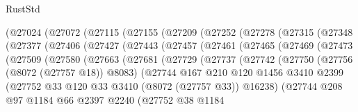 \begin{lexlean}{RustStd}
\begin{coremodule}
    (@27024
      (@27072
        (@27115
          (@27155
            (@27209
              (@27252
                (@27278
                  (@27315
                    (@27348
                      (@27377
                        (@27406
                          (@27427
                            (@27443
                              (@27457
                                (@27461
                                  (@27465
                                    (@27469
                                      (@27473
                                        (@27509
                                          (@27580
                                            (@27663
                                              (@27681
                                                (@27729
                                                  (@27737
                                                    (@27742
                                                      (@27750
                                                        (@27756 (@8072 (@27757 @18)) @8083)
                                                        (@27744
                                                          @167
                                                          @210
                                                          @120
                                                          @1456
                                                          @3410
                                                          @2399
                                                          (@27752
                                                            @33
                                                            @120
                                                            @33
                                                            @3410
                                                            (@8072 (@27757 @33))
                                                            @16238)
                                                          (@27744
                                                            @208
                                                            @97
                                                            @1184
                                                            @66
                                                            @2397
                                                            @2240
                                                            (@27752
                                                              @38
                                                              @1184

\end{coremodule}
\end{lexlean}
